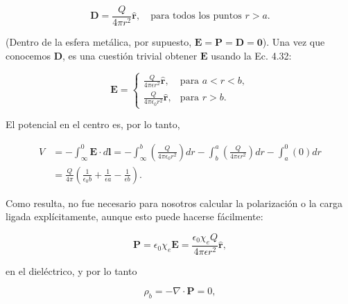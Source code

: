 \documentclass[12pt,a4paper]{report}
\newcommand{\esp}{\vspace{0.5cm}}
\begin{document}
	\esp
	
	\begin{equation*}
		\mathbf{D} = \frac{Q}{4\pi r^2} \hat{\mathbf{r}}, \quad \text{para todos los puntos } r > a.
	\end{equation*}
	
	\esp
	
	(Dentro de la esfera metálica, por supuesto, $\mathbf{E} = \mathbf{P} = \mathbf{D} = \mathbf{0}$). Una vez que conocemos $\mathbf{D}$, es una cuestión trivial obtener $\mathbf{E}$ usando la Ec. 4.32:
	
	\esp
	
	\begin{equation*}
		\mathbf{E} = \begin{cases} \frac{Q}{4\pi \epsilon r^2} \hat{\mathbf{r}}, & \text{para } a < r < b, \\ \frac{Q}{4\pi \epsilon_0 r^2} \hat{\mathbf{r}}, & \text{para } r > b. \end{cases}
	\end{equation*}
	
	\esp
	
	\noindent El potencial en el centro es, por lo tanto,
	
	\esp
	
	\begin{align*}
		V &= -\int_{\infty}^0 \mathbf{E} \cdot d\mathbf{l} = -\int_{\infty}^b \left( \frac{Q}{4\pi \epsilon_0 r^2} \right) dr - \int_b^a \left( \frac{Q}{4\pi \epsilon r^2} \right) dr - \int_a^0 (0) dr \\
		&= \frac{Q}{4\pi} \left( \frac{1}{\epsilon_0 b} + \frac{1}{\epsilon a} - \frac{1}{\epsilon b} \right).
	\end{align*}
	
	\esp
	
	Como resulta, no fue necesario para nosotros calcular la polarización o la carga ligada explícitamente, aunque esto puede hacerse fácilmente:
	
	\esp
	
	\begin{equation*}
		\mathbf{P} = \epsilon_0 \chi_e \mathbf{E} = \frac{\epsilon_0 \chi_e Q}{4\pi \epsilon r^2} \hat{\mathbf{r}},
	\end{equation*}
	
	\esp
	
	\noindent en el dieléctrico, y por lo tanto
	
	\esp
	
	\begin{equation*}
		\rho_b = -\nabla \cdot \mathbf{P} = 0,
	\end{equation*}
	
\end{document}
